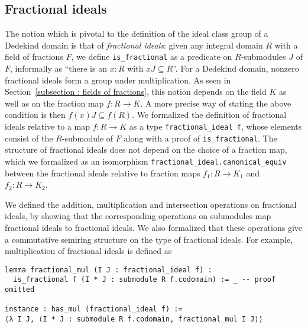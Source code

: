 \documentclass[a4paper,USenglish,cleveref, autoref, thm-restate]{lipics-v2021}
\newcommand{\lean}[1]{\texttt{#1}\xspace}
\begin{document}
\subsection{Fractional ideals}\label{subsection:frac_ideals}
The notion which is pivotal to the definition of the ideal class group of a Dedekind domain is that of \emph{fractional ideals}:
given any integral domain $R$ with a field of fractions $F$,
we define \lean{is\_fractional} as a predicate on $R$-submodules $J$ of $F$, informally as ``there is an $x : R$ with $x J \subseteq R$''.
For a Dedekind domain, nonzero fractional ideals form a group under multiplication.
As seen in Section~\ref{subsection : fields of fractions}, this notion depends on the field $K$ as well as on the fraction map $f\colon R\to K$.
A more precise way of stating the above condition is then
$f(x)J\subseteq f(R)$.
We formalized the definition of fractional ideals relative to a map $f\colon R\to K$ as a type \lean{fractional\_ideal f}, whose elements consist of the $R$-submodule of $F$ along with a proof of \lean{is\_fractional}.
The structure of fractional ideals does not depend on the choice of a fraction map, which we formalized as an isomorphism \lean{fractional\_ideal.canonical\_equiv} between the fractional ideals relative to fraction maps $f_1\colon R\to K_1$ and $f_2\colon R\to K_2$.

We defined the addition, multiplication and intersection operations on fractional ideals,
by showing that the corresponding operations on submodules map fractional ideals to fractional ideals.
We also formalized that these operations give a commutative semiring structure on the type of fractional ideals.
For example, multiplication of fractional ideals is defined as
\begin{lstlisting}
lemma fractional_mul (I J : fractional_ideal f) :
  is_fractional f (I * J : submodule R f.codomain) := _ -- proof omitted

instance : has_mul (fractional_ideal f) :=
⟨λ I J, ⟨I * J : submodule R f.codomain, fractional_mul I J⟩⟩
\end{lstlisting}
\end{document}
